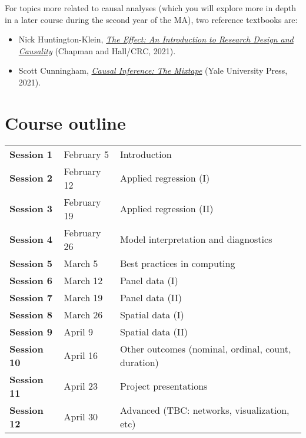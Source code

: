 \documentclass[12pt, a4paper]{article}
\begin{document}
For topics more related to causal analyses (which you will explore more in depth in a later course during the second year of the MA), two reference textbooks are:

\begin{itemize}
\setlength\itemsep{-5pt}
  \item Nick Huntington-Klein, \href{https://theeffectbook.net/}{\textit{The Effect: An Introduction to Research Design and Causality}} (Chapman and Hall/CRC, 2021).
  \item Scott Cunningham, \href{https://mixtape.scunning.com/}{\textit{Causal Inference: The Mixtape}} (Yale University Press, 2021).
\end{itemize}

\section{Course outline}


\begin{table*}[!ht]
  \centering

  \begin{tabular}{lll}
    \textbf{Session 1} & February 5 & Introduction \\
    \textbf{Session 2} & February 12 & Applied regression (I) \\
    \textbf{Session 3} & February 19 & Applied regression (II) \\
    \textbf{Session 4} & February 26 & Model interpretation and diagnostics \\
    \textbf{Session 5} & March 5 & Best practices in computing \\
    \textbf{Session 6} & March 12 & Panel data (I) \\
    \textbf{Session 7} & March 19 & Panel data (II) \\
    \textbf{Session 8} & March 26 & Spatial data (I) \\
    \textbf{Session 9} &  April 9 & Spatial data (II) \\
    \textbf{Session 10} & April 16 & Other outcomes (nominal, ordinal, count, duration) \\
    \textbf{Session 11} & April 23 & Project presentations \\
    \textbf{Session 12} & April 30 & Advanced (TBC: networks, visualization, etc) \\
  \end{tabular}
\end{table*}

\end{document}

